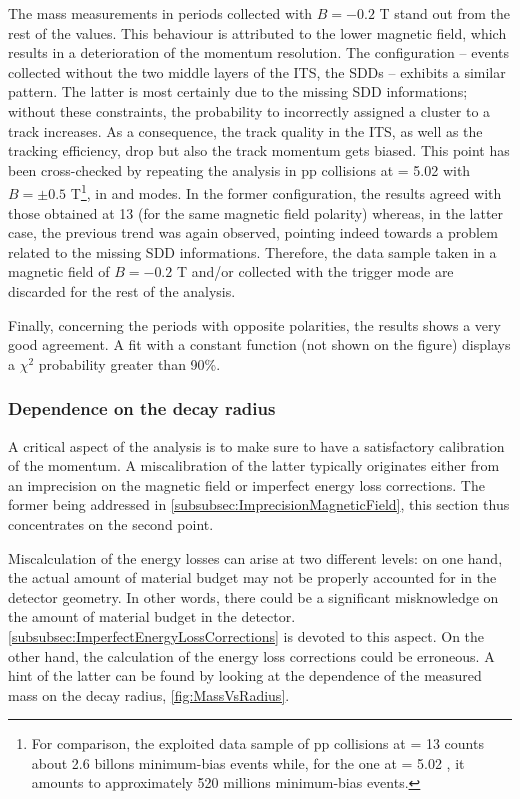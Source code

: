 The mass measurements in periods collected with $B =- 0.2$ T stand out from the rest of the values. This behaviour is attributed to the lower magnetic field, which results in a deterioration of the momentum resolution. The  configuration -- \ie events collected without the two middle layers of the ITS, the SDDs -- exhibits a similar pattern. The latter is most certainly due to the missing SDD informations; without these constraints, the probability to incorrectly assigned a cluster to a track increases. As a consequence, the track quality in the ITS, as well as the tracking efficiency, drop but also the track momentum gets biased. This point has been cross-checked by repeating the analysis in pp collisions at \sqrtS = 5.02 \tev with $B = \pm 0.5$ T\footnote{For comparison, the exploited data sample of pp collisions at \sqrtS = 13 \tev counts about 2.6 billons minimum-bias events while, for the one at \sqrtS = 5.02 \tev, it amounts to approximately 520 millions minimum-bias events.}, in  and  modes. In the former configuration, the results agreed with those obtained at 13 \tev (for the same magnetic field polarity) whereas, in the latter case, the previous trend was again observed, pointing indeed towards a problem related to the missing SDD informations. Therefore, the data sample taken in a magnetic field of $B = -0.2$ T and/or collected with the  trigger mode are discarded for the rest of the analysis.

Finally, concerning the periods with opposite polarities, the results shows a very good agreement. A fit with a constant function (not shown on the figure) displays a $\chi^2$ probability greater than 90\%.

\subsubsection{Dependence on the decay radius}
\label{subsubsec:DecayRadiusDependence}

A critical aspect of the analysis is to make sure to have a satisfactory calibration of the momentum. A miscalibration of the latter typically originates either from an imprecision on the magnetic field or imperfect energy loss corrections. The former being addressed in \Sec\ref{subsubsec:ImprecisionMagneticField}, this section thus concentrates on the second point.

Miscalculation of the energy losses can arise at two different levels: on one hand, the actual amount of material budget may not be properly accounted for in the detector geometry. In other words, there could be a significant misknowledge on the amount of material budget in the detector. \Sec\ref{subsubsec:ImperfectEnergyLossCorrections} is devoted to this aspect. On the other hand, the calculation of the energy loss corrections could be erroneous. A hint of the latter can be found by looking at the dependence of the measured mass on the decay radius, \fig\ref{fig:MassVsRadius}.\\

